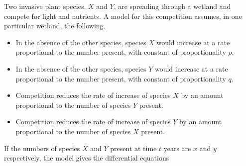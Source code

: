\documentclass[leqno]{article}
\begin{document}
\begin{enumerate}[
  label=\textbf{\arabic*.},
  leftmargin=*,
  topsep=0pt,
  partopsep=0pt,
  parsep=0pt
]
Two invasive plant species, $X$ and $Y$, are spreading through a wetland and compete for light and nutrients. A model for this competition assumes, in one particular wetland, the following. \\
\begin{itemize}
  \item In the absence of the other species, species $X$ would increase at a rate proportional to the number present, with constant of proportionality $p$.
  \item In the absence of the other species, species $Y$ would increase at a rate proportional to the number present, with constant of proportionality $q$.
  \item Competition reduces the rate of increase of species $X$ by an amount proportional to the number of species $Y$ present.
  \item Competition reduces the rate of increase of species $Y$ by an amount proportional to the number of species $X$ present. \\
\end{itemize}
If the numbers of species $X$ and $Y$ present at time $t$ years are $x$ and $y$ respectively, the model gives the differential equations 


\end{enumerate}
\end{document}
